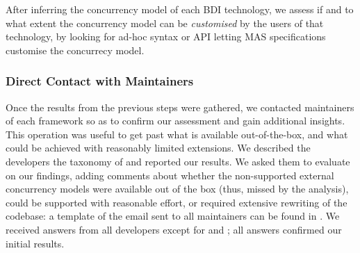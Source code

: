 After inferring the concurrency model of each \ac{BDI} technology, 
we assess if and to what extent the concurrency model can be \emph{customised} by the users of that technology,
by looking for ad-hoc syntax or \ac{API} letting \ac{MAS} specifications customise the concurrecy model.

\subsubsection{Direct Contact with Maintainers}
%
Once the results from the previous steps were gathered,
we contacted maintainers of each framework 
so as to confirm our assessment and gain additional insights.
%
This operation was useful to get past what is available out-of-the-box,
and what could be achieved with reasonably limited extensions.
%
We described the developers the taxonomy of 
and reported our results.
%
We asked them to evaluate on our findings,
adding comments about whether the non-supported external concurrency models were
available out of the box (thus, missed by the analysis),
could be supported with reasonable effort,
or required extensive rewriting of the codebase: 
a template of the email sent to all maintainers can be found in .
%
We received answers from all developers except for \jason{} and \spadebdi{};
all answers confirmed our initial results.

